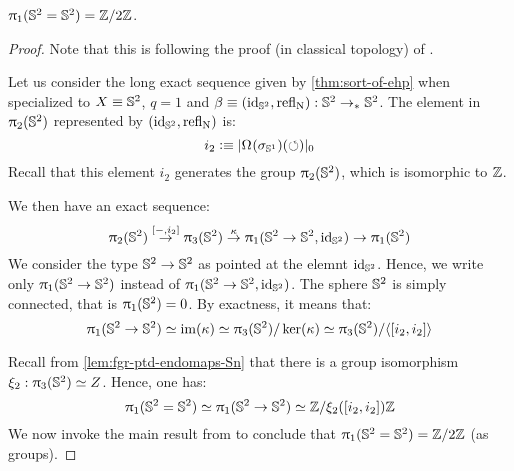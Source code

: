 \documentclass[english,a4paper]{lmcs}
\begin{document}
\begin{thm} \label{thm:Sp-sym=Z/2}
  $\uppi_{1} ({{\mathbb S^{2}}} = {{\mathbb S^{2}}}) = \mathbb{Z}/2 \mathbb{Z}$.
  \label{thm:S2-eq-S2-not-simply-connected}
\end{thm}
\begin{proof}
  Note that this is following the proof (in classical topology) of \cite{gwwhitehead}.

  Let us consider the long exact sequence given by \cref{thm:sort-of-ehp} when
  specialized to $X \equiv {{\mathbb S^{2}}}$, $q=1$ and $\beta\equiv (\mathord{\mathrm{id}}_{{\mathbb S^{2}}}, \mathop{{\mathrm{refl}}_{\mathrm{N}}}): {{\mathbb S^{2}}}
  \to_\ast {{\mathbb S^{2}}}$. The element in $\uppi_{2}({{\mathbb S^{2}}})$ represented by $(\mathord{\mathrm{id}}_{{\mathbb S^{2}}}, \mathop{{\mathrm{refl}}_{\mathrm{N}}})$
  is:
  \begin{equation}
    i_2 \vcentcolon\equiv \lvert\mathop{\Omega^{}}(\sigma_{{\mathbb S^{1}}})(\mathord{\circlearrowleft})\rvert_0
    \label{eq:def-i2-gen-pi2S2}
  \end{equation}
  Recall that this element $i_2$ generates the group $\uppi_{2}({{\mathbb S^{2}}})$, which is
  isomorphic to $\mathbb{Z}$.

  We then have an exact sequence:
  \begin{equation}
    \uppi_{2}({{\mathbb S^{2}}}) \overset{[\mathord{{-}}, i_2]} \to \uppi_{3}({{\mathbb S^{2}}})
    \overset\kappa \to \uppi_{1} ({{\mathbb S^{2}}} \to {{\mathbb S^{2}}}, \mathord{\mathrm{id}}_{{\mathbb S^{2}}}) \to \uppi_{1} ({{\mathbb S^{2}}})
    \label{eq:exact-seq-compute-pi1-S2eqS2}
  \end{equation}
  We consider the type ${{\mathbb S^{2}}} \to {{\mathbb S^{2}}}$ as pointed at the elemnt $\mathord{\mathrm{id}}_{{\mathbb S^{2}}}$. Hence,
  we write only $\uppi_{1}({{\mathbb S^{2}}} \to {{\mathbb S^{2}}})$ instead of $\uppi_{1}({{\mathbb S^{2}}}\to{{\mathbb S^{2}}},\mathord{\mathrm{id}}_{{\mathbb S^{2}}})$.
  The sphere ${{\mathbb S^{2}}}$ is simply connected, that is $\uppi_{1}({{\mathbb S^{2}}}) = 0$. By exactness,
  it means that:
  \begin{equation}
    \uppi_{1}({{\mathbb S^{2}}} \to {{\mathbb S^{2}}}) \simeq \operatorname{im}(\kappa) \simeq \uppi_{3}({{\mathbb S^{2}}}) / \ker(\kappa)
    \simeq \uppi_{3} ({{\mathbb S^{2}}}) / \langle [i_2,i_2] \rangle
    \label{eq:fgr-SpeqSp-as-quotient}
  \end{equation}

  Recall from \cref{lem:fgr-ptd-endomaps-Sn} that there is a group isomorphism
  $\xi_2: \uppi_{3} ({{\mathbb S^{2}}}) \simeq Z$. Hence, one has:
  \begin{equation}
    \uppi_{1} ({{\mathbb S^{2}}} = {{\mathbb S^{2}}}) \simeq \uppi_{1} ({{\mathbb S^{2}}} \to {{\mathbb S^{2}}}) \simeq \mathbb{Z} / \xi_2([i_2,i_2])\mathbb{Z}
    \label{eq:fgr-SpeqSp-ZovernZ}
  \end{equation}
  We now invoke the main result from \cite{brunerie:thesis} to conclude that
  $\uppi_{1} ({{\mathbb S^{2}}} = {{\mathbb S^{2}}}) = \mathbb{Z}/2\mathbb{Z}$ (as groups).


\end{proof}
\end{document}
